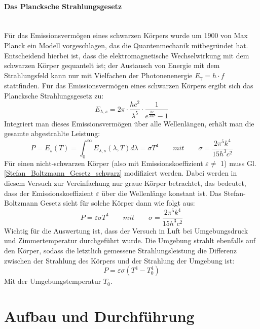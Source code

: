 \documentclass[12pt,a4paper]{article}
\begin{document}
\paragraph{Das Plancksche Strahlungsgesetz}\mbox{}\\
Für das Emissionsvermögen eines schwarzen Körpers wurde um 1900 von Max Planck ein Modell vorgeschlagen, das die Quantenmechanik mitbegründet hat. Entscheidend hierbei ist, dass die elektromagnetische Wechselwirkung mit dem schwarzen Körper gequantelt ist; der Austausch von Energie mit dem Strahlungsfeld kann nur mit Vielfachen der Photonenenergie $E_\gamma = h \cdot f$ stattfinden. Für das Emissionsvermögen eines schwarzen Körpers ergibt sich das Plancksche Strahlungsgesetz zu:
\begin{equation}
E_{\lambda, s} = 2 \pi \cdot \dfrac{h c^2}{\lambda^5} \cdot \dfrac{1}{e^{\frac{hc}{\lambda kT}} - 1}
\end{equation}
Integriert man dieses Emissionsvermögen über alle Wellenlängen, erhält man die gesamte abgestrahlte Leistung:
\begin{equation}
P = E_s (T) = \int_0^\infty E_{\lambda, s} (\lambda, T) d\lambda = \sigma T^4 \qquad mit \qquad \sigma = \dfrac{2 \pi^5 k^4}{15h^3c^2}
\label{Stefan_Boltzmann_Gesetz_schwarz}
\end{equation}
Für einen nicht-schwarzen Körper (also mit Emissionskoeffizient $\varepsilon \neq$ 1) muss Gl. \ref{Stefan_Boltzmann_Gesetz_schwarz} modifiziert werden. Dabei werden in diesem Versuch zur Vereinfachung nur graue Körper betrachtet, das bedeutet, dass der Emissionskoeffizient $\varepsilon$ über die Wellenlänge konstant ist. Das Stefan-Boltzmann Gesetz sieht für solche Körper dann wie folgt aus:
\begin{equation}
P = \varepsilon \sigma T^4 \qquad mit \qquad \sigma = \dfrac{2 \pi^5 k^4}{15h^3c^2}
\label{Stefan_Boltzmann_Gesetz_grau}
\end{equation}
Wichtig für die Auswertung ist, dass der Versuch in Luft bei Umgebungsdruck und Zimmertemperatur durchgeführt wurde. Die Umgebung strahlt ebenfalls auf den Körper, sodass die letztlich gemessene Strahlungsleistung die Differenz zwischen der Strahlung des Körpers und der Strahlung der Umgebung ist:
\begin{equation}
P = \varepsilon \sigma (T^4 - T_0^4)
\label{Stefan_Boltzmann_Gesetz_gemessen}
\end{equation}
Mit der Umgebungstemperatur $T_0$.



\section{Aufbau und Durchführung}
\end{document}
